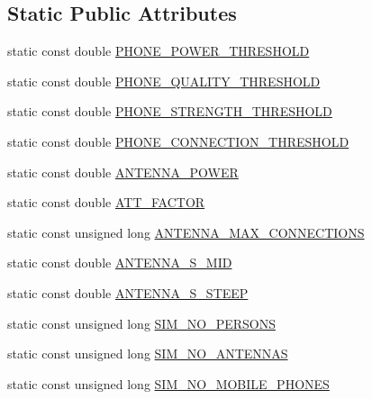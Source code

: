 \subsection*{Static Public Attributes}
\begin{DoxyCompactItemize}
\item 
static const double \mbox{\hyperlink{class_constants_a1e95cbdc2db02f6147ddf8ac61a428ab}{P\+H\+O\+N\+E\+\_\+\+P\+O\+W\+E\+R\+\_\+\+T\+H\+R\+E\+S\+H\+O\+LD}}
\item 
static const double \mbox{\hyperlink{class_constants_a2c8a9d965bae29c19ff18c8b80260982}{P\+H\+O\+N\+E\+\_\+\+Q\+U\+A\+L\+I\+T\+Y\+\_\+\+T\+H\+R\+E\+S\+H\+O\+LD}}
\item 
static const double \mbox{\hyperlink{class_constants_a24b6069c3365fb95c4b853129e4d4a3e}{P\+H\+O\+N\+E\+\_\+\+S\+T\+R\+E\+N\+G\+T\+H\+\_\+\+T\+H\+R\+E\+S\+H\+O\+LD}}
\item 
static const double \mbox{\hyperlink{class_constants_a1cbf0a4e111b9d2e13b33e771a342b4f}{P\+H\+O\+N\+E\+\_\+\+C\+O\+N\+N\+E\+C\+T\+I\+O\+N\+\_\+\+T\+H\+R\+E\+S\+H\+O\+LD}}
\item 
static const double \mbox{\hyperlink{class_constants_a3f6f3825098d8eb1dc8081158c46c48a}{A\+N\+T\+E\+N\+N\+A\+\_\+\+P\+O\+W\+ER}}
\item 
static const double \mbox{\hyperlink{class_constants_a3738ccd4e7931b93885bdedf98528293}{A\+T\+T\+\_\+\+F\+A\+C\+T\+OR}}
\item 
static const unsigned long \mbox{\hyperlink{class_constants_af89a10a7d59ac020b1fa06cf673ef01f}{A\+N\+T\+E\+N\+N\+A\+\_\+\+M\+A\+X\+\_\+\+C\+O\+N\+N\+E\+C\+T\+I\+O\+NS}}
\item 
static const double \mbox{\hyperlink{class_constants_aea09e28749c0da58a4c831f9eabea773}{A\+N\+T\+E\+N\+N\+A\+\_\+\+S\+\_\+\+M\+ID}}
\item 
static const double \mbox{\hyperlink{class_constants_ae4b1b2c15d1e5bbb76464c03036c6baa}{A\+N\+T\+E\+N\+N\+A\+\_\+\+S\+\_\+\+S\+T\+E\+EP}}
\item 
static const unsigned long \mbox{\hyperlink{class_constants_a627fe53a717da1ca017b2467fb1dd4df}{S\+I\+M\+\_\+\+N\+O\+\_\+\+P\+E\+R\+S\+O\+NS}}
\item 
static const unsigned long \mbox{\hyperlink{class_constants_a0f6bc08399ad62727732e08a65c3bd0f}{S\+I\+M\+\_\+\+N\+O\+\_\+\+A\+N\+T\+E\+N\+N\+AS}}
\item 
static const unsigned long \mbox{\hyperlink{class_constants_a7da9e25a998c58c4388cbd45411f4232}{S\+I\+M\+\_\+\+N\+O\+\_\+\+M\+O\+B\+I\+L\+E\+\_\+\+P\+H\+O\+N\+ES}}

\end{DoxyCompactItemize}
